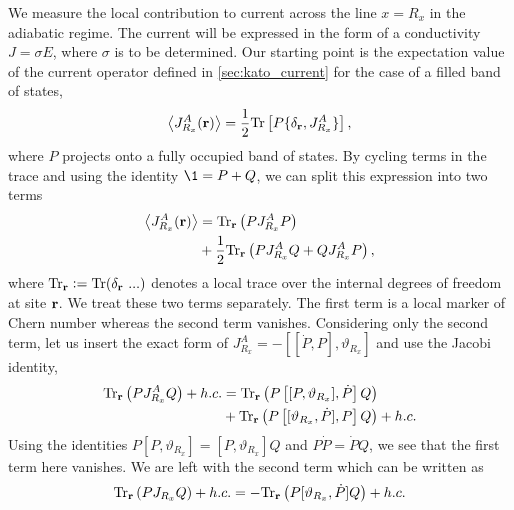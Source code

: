 We measure the local contribution to current across the line $x=R_x$ in the adiabatic regime. The current will be expressed in the form of a conductivity $J = \sigma E$, where $\sigma$ is to be determined. Our starting point is the expectation value of the current operator defined in \textsection\ref{sec:kato_current} for the case of a filled band of states,
\begin{align}
    \left \langle J^A_{R_x} (\textbf r) \right \rangle
    =\frac{1}{2}  \textup{Tr} \left [P  \{\delta_{\textbf r}, J_{R_x}^A \} \right ],
\end{align}
where $P$ projects onto a fully occupied band of states. By cycling terms in the trace and using the identity $\1 = P+Q$, we can split this expression into two terms
\begin{align} \label{eqn:j_val}
\begin{aligned}
    \left \langle J^A_{R_x}(\textbf r) \right \rangle & = \textup{Tr}_{\textbf r} 
    \left ( 
    P J_{R_x}^AP
    \right ) \\& +  
    \frac{1}{2}\textup{Tr}_{\textbf r} 
    \left ( 
    P J_{R_x}^A Q + QJ_{R_x}^AP
    \right ),
\end{aligned}
\end{align}
where $\textup{Tr}_{\textbf r} \vcentcolon= \textup{Tr}(\delta_{\textbf r}\ ... )$ denotes a local trace over the internal degrees of freedom at site $\textbf r$. We treat these two terms separately. The first term is a local marker of Chern number whereas the second term vanishes. Considering only the second term, let us insert the exact form of $J_{R_x}^A = -[[\dot P,P], \vartheta_{R_x} ]$ and use the Jacobi identity,
\begin{align} \label{eqn:cyclic}
\begin{aligned}
    \textup{Tr} _{\textbf r} \left ( P J_{R_x}^AQ  \right ) + h.c. &=
     \textup{Tr} _{\textbf r} 
    \left ( P  
    \left [[P, \vartheta_{R_x}],\dot P\right ]
    Q  \right ) \\ 
    &+
     \textup{Tr} _{\textbf r} 
    \left ( P  
    \left [[ \vartheta_{R_x},\dot P], P\right ]
    Q  \right )+ h.c.
\end{aligned}
\end{align}
Using the identities $P[P,\vartheta_{R_x}] =[P,\vartheta_{R_x}]Q $ and $P \dot P = \dot P Q$, we see that the first term here vanishes. We are left with the second term which can be written as
\begin{align}
    \textup{Tr} _{\textbf r} \left ( P J_{R_x}Q  \right ) + h.c. = 
    - \textup{Tr} _{\textbf r} 
    \left ( P  
    [ \vartheta_{R_x},\dot P]
    Q  \right )+ h.c.
\end{align}
